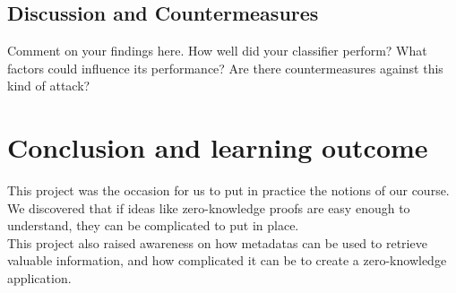 \documentclass[10pt,conference,compsocconf]{IEEEtran}
\begin{document}
\subsection{Discussion and Countermeasures}
Comment on your findings here. How well did your classifier perform? What factors could influence its performance? Are there countermeasures against this kind of attack?

\section{Conclusion and learning outcome}

This project was the occasion for us to put in practice the notions of our course. We discovered that if ideas like zero-knowledge proofs are easy enough to understand, they can be complicated to put in place.\\
This project also raised awareness on how metadatas can be used to retrieve valuable information, and how complicated it can be to create a zero-knowledge application.\\



{}
\end{document}
